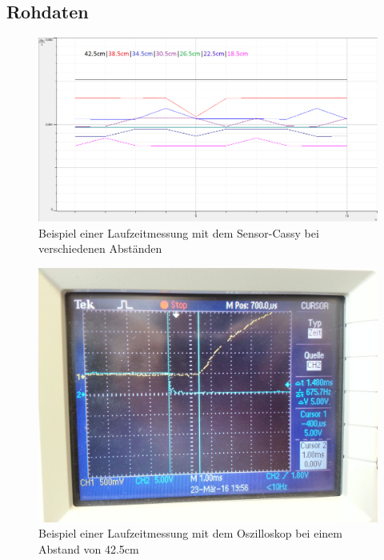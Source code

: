 \documentclass[11pt]{beamer}
\begin{document}
\subsection{Rohdaten}
\begin{frame}
\begin{figure}[H]
\centering
\includegraphics[scale=0.4]{Bilder/Rohdaten-Laufzeitmessung.png}
\caption{Beispiel einer Laufzeitmessung mit dem Sensor-Cassy bei verschiedenen Abständen}
\label{Laufzeitrohdaten}
\end{figure}
\end{frame}
\begin{frame}
\begin{figure}[H]
\centering
\includegraphics[scale=0.08]{Bilder/oszi.jpg}
\caption{Beispiel einer Laufzeitmessung mit dem Oszilloskop bei einem Abstand von 42.5cm}
\end{figure}
\end{frame}
\end{document}
